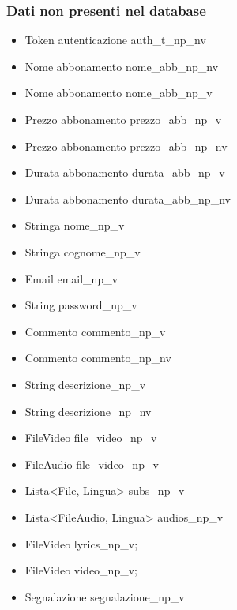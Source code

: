 \subsubsection{Dati non presenti nel database}
\begin{itemize}
    \item Token autenticazione auth\_t\_np\_nv
    \item Nome abbonamento nome\_abb\_np\_nv
    \item Nome abbonamento nome\_abb\_np\_v
    \item Prezzo abbonamento prezzo\_abb\_np\_v
    \item Prezzo abbonamento prezzo\_abb\_np\_nv
    \item Durata abbonamento durata\_abb\_np\_v
    \item Durata abbonamento durata\_abb\_np\_nv
    \item Stringa nome\_np\_v
    \item Stringa cognome\_np\_v
    \item Email email\_np\_v
    \item String password\_np\_v
    \item Commento commento\_np\_v
    \item Commento commento\_np\_nv
    \item String descrizione\_np\_v
    \item String descrizione\_np\_nv
    \item FileVideo file\_video\_np\_v
    \item FileAudio file\_video\_np\_v
    \item Lista<File, Lingua> subs\_np\_v
    \item Lista<FileAudio, Lingua> audios\_np\_v
    \item FileVideo lyrics\_np\_v;
    \item FileVideo video\_np\_v;
    \item Segnalazione segnalazione\_np\_v

\end{itemize}

